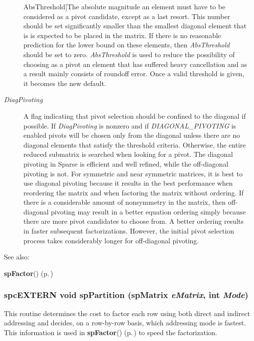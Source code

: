 \begin{Desc}
\begin{description}
{Abs\-Threshold}]The absolute magnitude an element must have to be considered as a pivot candidate, except as a last resort. This number should be set significantly smaller than the smallest diagonal element that is is expected to be placed in the matrix. If there is no reasonable prediction for the lower bound on these elements, then {\em Abs\-Threshold} should be set to zero. {\em Abs\-Threshold} is used to reduce the possibility of choosing as a pivot an element that has suffered heavy cancellation and as a result mainly consists of roundoff error. Once a valid threshold is given, it becomes the new default. \item[{\em 
Diag\-Pivoting}]A flag indicating that pivot selection should be confined to the diagonal if possible. If {\em Diag\-Pivoting} is nonzero and if {\em DIAGONAL\_\-PIVOTING} is enabled pivots will be chosen only from the diagonal unless there are no diagonal elements that satisfy the threshold criteria. Otherwise, the entire reduced submatrix is searched when looking for a pivot. The diagonal pivoting in Sparse is efficient and well refined, while the off-diagonal pivoting is not. For symmetric and near symmetric matrices, it is best to use diagonal pivoting because it results in the best performance when reordering the matrix and when factoring the matrix without ordering. If there is a considerable amount of nonsymmetry in the matrix, then off-diagonal pivoting may result in a better equation ordering simply because there are more pivot candidates to choose from. A better ordering results in faster subsequent factorizations. However, the initial pivot selection process takes considerably longer for off-diagonal pivoting.\end{description}
\end{Desc}
\begin{Desc}
\item[See also: ]\par
{\bf sp\-Factor}() {\rm (p.\,\pageref{spMatrix_8h_a30})} \end{Desc}
\subsubsection{\setlength{\rightskip}{0pt plus 5cm}spc\-EXTERN void sp\-Partition ({\bf sp\-Matrix} {\em e\-Matrix}, int {\em Mode})}\label{spMatrix_8h_a47}


This routine determines the cost to factor each row using both direct and indirect addressing and decides, on a row-by-row basis, which addressing mode is fastest. This information is used in {\bf sp\-Factor}() {\rm (p.\,\pageref{spMatrix_8h_a30})} to speed the factorization.

